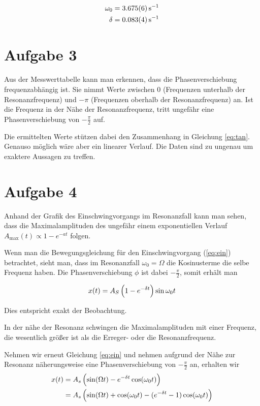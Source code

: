 \documentclass[a4paper,german,12pt,smallheadings]{scrartcl}
\begin{document}
\begin{align}
  \omega_0 &= \SI{3,675+-0.006}{s^{-1}} \\
  \delta &= \SI{0.083+-0.004}{s^{-1}}
\end{align}

\section{Aufgabe 3}
Aus der Messwerttabelle kann man erkennen, dass die Phasenverschiebung
frequenzabhängig ist. Sie nimmt Werte zwischen $0$ (Frequenzen unterhalb der
Resonanzfrequenz) und $-\pi$ (Frequenzen oberhalb der Resonanzfrequenz) an. Ist
die Frequenz in der Nähe der Resonanzfrequenz, tritt ungefähr eine
Phasenverschiebung von $-\frac{\pi}{2}$ auf.

Die ermittelten Werte stützen dabei den Zusammenhang in Gleichung \ref{eq:tan}.
Genauso möglich wäre aber ein linearer Verlauf. Die Daten sind zu ungenau um
exaktere Aussagen zu treffen.

\section{Aufgabe 4}
Anhand der Grafik des Einschwingvorgangs im Resonanzfall kann man sehen, dass
die Maximalamplituden des ungefähr einem exponentiellen Verlauf
$A_\text{max}(t) \propto 1 - e^{- a t}$ folgen.

Wenn man die Bewegungsgleichung für den Einschwingvorgang
(\ref{eq:ein}) betrachtet, sieht man, dass im Resonanzfall $\omega_0 = \Omega$
die Kosinusterme die selbe Frequenz haben. Die Phasenverschiebung $\phi$ ist
dabei $-\frac{\pi}{2}$, somit erhält man

\begin{equation}
  x(t) = A_S \del{1 - e^{-\delta t}} \sin \omega_0 t
\end{equation}

Dies entspricht exakt der Beobachtung.

In der nähe der Resonanz schwingen die Maximalamplituden mit einer Frequenz,
die wesentlich größer ist als die Erreger- oder die Resonanzfrequenz.

Nehmen wir erneut Gleichung \ref{eq:ein} und nehmen aufgrund der Nähe zur
Resonanz näherungsweise eine Phasenverschiebung von $-\frac{\pi}{2}$ an,
erhalten wir
\begin{align}
  x(t) &= A_s \del{\sin(\Omega t) - e^{-\delta t} \cos(\omega_0 t)} \\
       &= A_s \del{\sin(\Omega t) + \cos(\omega_0 t) - (e^{-\delta t} - 1) \cos(\omega_0 t)}
\end{align}
\end{document}
